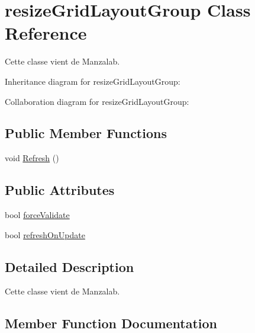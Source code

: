 \hypertarget{classresize_grid_layout_group}{}\section{resize\+Grid\+Layout\+Group Class Reference}
\label{classresize_grid_layout_group}


Cette classe vient de Manzalab.  




Inheritance diagram for resize\+Grid\+Layout\+Group\+:


Collaboration diagram for resize\+Grid\+Layout\+Group\+:
\subsection*{Public Member Functions}
\begin{DoxyCompactItemize}
\item 
void \hyperlink{classresize_grid_layout_group_a66d74a61ee39dd250f5ce5de96e0b368}{Refresh} ()
\end{DoxyCompactItemize}
\subsection*{Public Attributes}
\begin{DoxyCompactItemize}
\item 
bool \hyperlink{classresize_grid_layout_group_a138a851001032d6d388cae022f8c3e6f}{force\+Validate}
\item 
bool \hyperlink{classresize_grid_layout_group_a578454d3481dd15bc62a7ec53702d98d}{refresh\+On\+Update}
\end{DoxyCompactItemize}


\subsection{Detailed Description}
Cette classe vient de Manzalab. 



\subsection{Member Function Documentation}
\mbox{\label{classresize_grid_layout_group_a66d74a61ee39dd250f5ce5de96e0b368}} 
